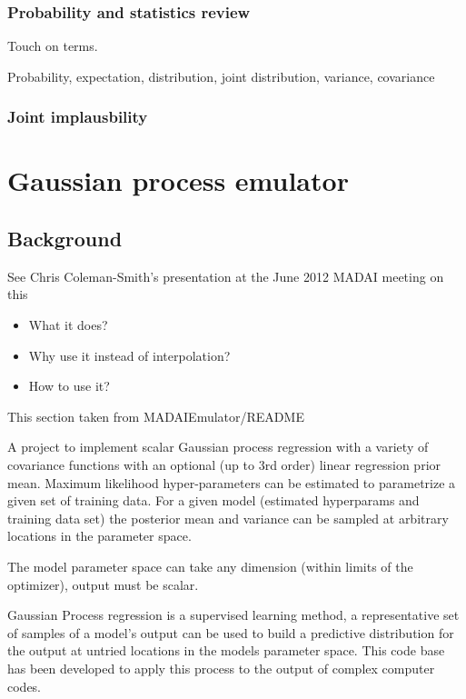 \documentclass{article}
\begin{document}
\subsubsection{Probability and statistics review}

Touch on terms.

Probability, expectation, distribution, joint distribution, variance,
covariance

\subsubsection{Joint implausbility}

\section{Gaussian process emulator}

\subsection{Background}

See Chris Coleman-Smith's presentation at the June 2012 MADAI meeting on this

\begin{itemize}

\item What it does?

\item Why use it instead of interpolation?

\item How to use it?

\end{itemize}

This section taken from MADAIEmulator/README

A project to implement scalar Gaussian process regression with a
variety of covariance functions with an optional (up to 3rd order)
linear regression prior mean. Maximum likelihood hyper-parameters can
be estimated to parametrize a given set of training data. For a given
model (estimated hyperparams and training data set) the posterior mean
and variance can be sampled at arbitrary locations in the parameter
space.

The model parameter space can take any dimension (within limits of the
optimizer), output must be scalar.

Gaussian Process regression is a supervised learning method, a
representative set of samples of a model's output can be used to build
a predictive distribution for the output at untried locations in the
models parameter space. This code base has been developed to apply
this process to the output of complex computer codes.
\end{document}
